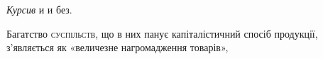\documentclass{kapital}
\begin{document}
    \emph{Курсив} и  и без.

    Багатство {\scshape суспільств}, що в них панує капіталістичний спосіб
продукції, з’являється як «величезне нагромадження товарів»,
\end{document}
